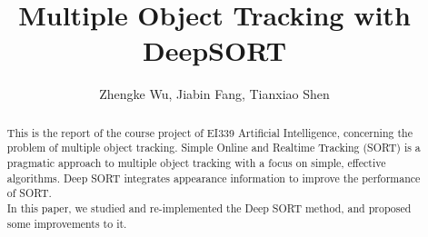 \documentclass[conference]{IEEEtran}
\begin{document}
%
\title{Multiple Object Tracking with DeepSORT}
%
%
%

\author{
    Zhengke Wu,
    Jiabin Fang,
    Tianxiao Shen
}

%


\maketitle

\begin{abstract}
This is the report of the course project of EI339 Artificial Intelligence, concerning the problem of multiple object tracking. Simple Online and Realtime Tracking (SORT) is a pragmatic
approach to multiple object tracking with a focus on simple,
effective algorithms. Deep SORT integrates appearance information to improve the performance of SORT. \\
In this paper, we studied and re-implemented the Deep SORT method, and proposed some improvements to it.
\end{abstract}

\end{document}
